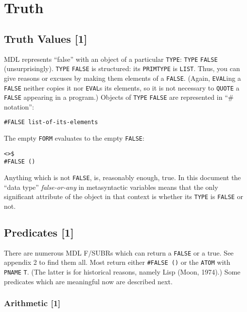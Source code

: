 \documentclass[a4paper]{scrbook}
\begin{document}
\chapter{Truth}\label{chapter-8.-truth}

\section{Truth Values {[}1{]}}\label{truth-values-1}

MDL represents ``false'' with an object of a particular \texttt{TYPE}: \texttt{TYPE}
\texttt{FALSE} (unsurprisingly). \texttt{TYPE} \texttt{FALSE} is structured: its
\texttt{PRIMTYPE} is \texttt{LIST}. Thus, you can give reasons or excuses by making them elements of a \texttt{FALSE}.
(Again, \texttt{EVAL}ing a \texttt{FALSE} neither copies it nor \texttt{EVAL}s its elements, so it is not necessary to
\texttt{QUOTE} a \texttt{FALSE} appearing in a program.) Objects of \texttt{TYPE} \texttt{FALSE} are represented in ``\#
notation'':

\begin{verbatim}
#FALSE list-of-its-elements
\end{verbatim}

The empty \texttt{FORM} evaluates to the empty \texttt{FALSE}:

\begin{verbatim}
<>$
#FALSE ()
\end{verbatim}

Anything which is not \texttt{FALSE}, is, reasonably enough, true. In this document the ``data type'' \emph{false-or-any}
in metasyntactic variables means that the only significant attribute of the object in that context is whether its
\texttt{TYPE} is \texttt{FALSE} or not.

\section{Predicates {[}1{]}}\label{predicates-1}

There are numerous MDL F/SUBRs which can return a \texttt{FALSE} or a true. See appendix 2 to find them all. Most return
either \texttt{\#FALSE\ ()} or the \texttt{ATOM} with \texttt{PNAME} \texttt{T}. (The latter is
for historical reasons, namely Lisp (Moon, 1974).) Some predicates which are meaningful now are described next.

\subsection{Arithmetic {[}1{]}}\label{arithmetic-1}
\end{document}
